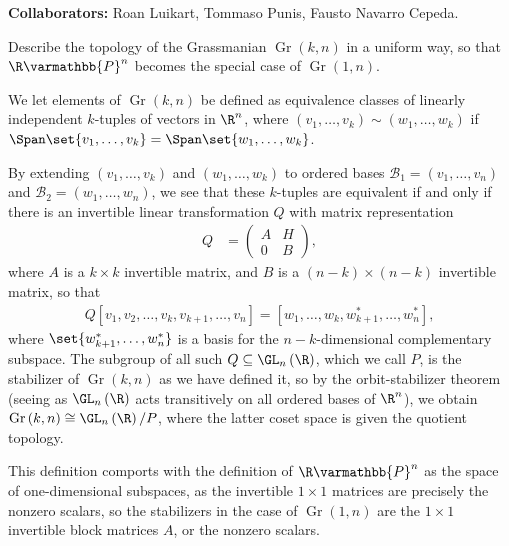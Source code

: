 \documentclass[10pt]{mypackage}
\renewcommand*{\mathbb}[1]{\varmathbb{#1}}
\begin{document}
\RaggedRight
\textbf{Collaborators:} Roan Luikart, Tommaso Punis, Fausto Navarro Cepeda.
\begin{problem}[Problem 1]
  Describe the topology of the Grassmanian $\operatorname{Gr}\left( k,n \right)$ in a uniform way, so that $\R\mathbb{P}^n$ becomes the special case of $\operatorname{Gr}\left( 1,n \right)$.
\end{problem}
\begin{solution}
We let elements of $\operatorname{Gr}\left( k,n \right)$ be defined as equivalence classes of linearly independent $k$-tuples of vectors in $\R^n$, where $\left( v_1,\dots,v_k \right) \sim \left( w_1,\dots,w_k \right)$ if $\Span \set{v_1,\dots,v_k} = \Span\set{w_1,\dots,w_k} $.\newline

By extending $\left( v_1,\dots,v_k \right)$ and $\left( w_1,\dots,w_k \right)$ to ordered bases $\mathcal{B}_1 = \left( v_1,\dots,v_n \right)$ and $\mathcal{B}_2 = \left( w_1,\dots,w_n \right)$, we see that these $k$-tuples are equivalent if and only if there is an invertible linear transformation $Q$ with matrix representation
\begin{align*}
  Q &= \begin{pmatrix}A & H \\ 0 & B\end{pmatrix},
\end{align*}
where $A$ is a $k\times k$ invertible matrix, and $B$ is a $\left( n-k \right)\times \left( n-k \right)$ invertible matrix, so that 
\begin{align*}
    Q \left[ v_1,v_2,\dots,v_k,v_{k+1},\dots,v_n \right] = \left[ w_1,\dots,w_k,w^{\ast}_{k+1},\dots,w_n^{\ast} \right],
\end{align*}
where $\set{w_{k+1}^{\ast},\dots,w_n^{\ast}}$ is a basis for the $n-k$-dimensional complementary subspace. The subgroup of all such $Q\subseteq \GL_n\left( \R \right)$, which we call $P$, is the stabilizer of $\operatorname{Gr}\left( k,n \right)$ as we have defined it, so by the orbit-stabilizer theorem (seeing as $\GL_n\left( \R \right)$ acts transitively on all ordered bases of $\R^n$), we obtain $\operatorname{Gr}\left( k,n \right)\cong \GL_n\left( \R \right)/P$, where the latter coset space is given the quotient topology.\newline

This definition comports with the definition of $\R\mathbb{P}^{n}$ as the space of one-dimensional subspaces, as the invertible $1\times 1$ matrices are precisely the nonzero scalars, so the stabilizers in the case of $\operatorname{Gr}\left( 1,n \right)$ are the $1\times 1$ invertible block matrices $A$, or the nonzero scalars.
\end{solution}
\end{document}
